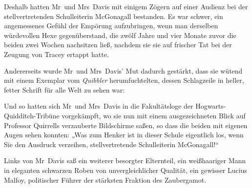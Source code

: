 Deshalb hatten Mr~und Mrs~Davis mit einigem Zögern auf einer Audienz bei der stellvertretenden Schulleiterin McGonagall bestanden. Es war schwer, ein angemessenes Gefühl der Empörung aufzubringen, wenn man derselben würdevollen Hexe gegenüberstand, die zwölf Jahre und vier Monate zuvor die beiden zwei Wochen nachsitzen ließ, nachdem sie sie auf frischer Tat bei der Zeugung von Tracey ertappt hatte.

Andererseits wurde Mr~und Mrs~Davis' Mut dadurch gestärkt, dass sie wütend mit einem Exemplar vom \emph{Quibbler} herumfuchtelten, dessen Schlagzeile in heller, fetter Schrift für alle Welt zu sehen war:


Und so hatten sich Mr~und Mrs~Davis in die Fakultätsloge der Hogwarts-Quidditch-Tribüne vorgekämpft, wo sie nun mit einem ausgezeichneten Blick auf Professor Quirrells verzauberte Bildschirme saßen, so dass die beiden mit eigenen Augen sehen konnten: „Was zum Henker ist in dieser Schule eigentlich los, wenn Sie den Ausdruck verzeihen, stellvertretende Schulleiterin McGonagall!“

Links von Mr~Davis saß ein weiterer besorgter Elternteil, ein weißhaariger Mann in eleganten schwarzen Roben von unvergleichlicher Qualität, ein gewisser Lucius Malfoy, politischer Führer der stärksten Fraktion des Zaubergamot.

